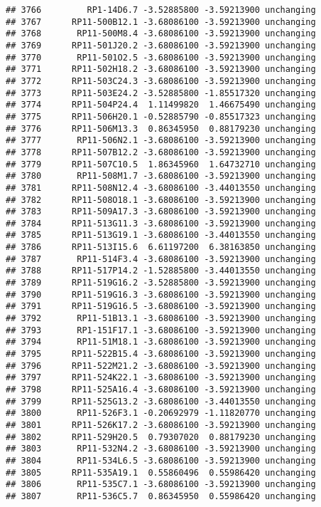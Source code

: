 \documentclass[]{article}
\begin{document}
\begin{verbatim}
## 3766         RP1-14D6.7 -3.52885800 -3.59213900 unchanging
## 3767      RP11-500B12.1 -3.68086100 -3.59213900 unchanging
## 3768       RP11-500M8.4 -3.68086100 -3.59213900 unchanging
## 3769      RP11-501J20.2 -3.68086100 -3.59213900 unchanging
## 3770       RP11-501O2.5 -3.68086100 -3.59213900 unchanging
## 3771      RP11-502H18.2 -3.68086100 -3.59213900 unchanging
## 3772      RP11-503C24.3 -3.68086100 -3.59213900 unchanging
## 3773      RP11-503E24.2 -3.52885800 -1.85517320 unchanging
## 3774      RP11-504P24.4  1.11499820  1.46675490 unchanging
## 3775      RP11-506H20.1 -0.52885790 -0.85517323 unchanging
## 3776      RP11-506M13.3  0.86345950  0.88179230 unchanging
## 3777       RP11-506N2.1 -3.68086100 -3.59213900 unchanging
## 3778      RP11-507B12.2 -3.68086100 -3.59213900 unchanging
## 3779      RP11-507C10.5  1.86345960  1.64732710 unchanging
## 3780       RP11-508M1.7 -3.68086100 -3.59213900 unchanging
## 3781      RP11-508N12.4 -3.68086100 -3.44013550 unchanging
## 3782      RP11-508O18.1 -3.68086100 -3.59213900 unchanging
## 3783      RP11-509A17.3 -3.68086100 -3.59213900 unchanging
## 3784      RP11-513G11.3 -3.68086100 -3.59213900 unchanging
## 3785      RP11-513G19.1 -3.68086100 -3.44013550 unchanging
## 3786      RP11-513I15.6  6.61197200  6.38163850 unchanging
## 3787       RP11-514F3.4 -3.68086100 -3.59213900 unchanging
## 3788      RP11-517P14.2 -1.52885800 -3.44013550 unchanging
## 3789      RP11-519G16.2 -3.52885800 -3.59213900 unchanging
## 3790      RP11-519G16.3 -3.68086100 -3.59213900 unchanging
## 3791      RP11-519G16.5 -3.68086100 -3.59213900 unchanging
## 3792       RP11-51B13.1 -3.68086100 -3.59213900 unchanging
## 3793       RP1-151F17.1 -3.68086100 -3.59213900 unchanging
## 3794       RP11-51M18.1 -3.68086100 -3.59213900 unchanging
## 3795      RP11-522B15.4 -3.68086100 -3.59213900 unchanging
## 3796      RP11-522M21.2 -3.68086100 -3.59213900 unchanging
## 3797      RP11-524K22.1 -3.68086100 -3.59213900 unchanging
## 3798      RP11-525A16.4 -3.68086100 -3.59213900 unchanging
## 3799      RP11-525G13.2 -3.68086100 -3.44013550 unchanging
## 3800       RP11-526F3.1 -0.20692979 -1.11820770 unchanging
## 3801      RP11-526K17.2 -3.68086100 -3.59213900 unchanging
## 3802      RP11-529H20.5  0.79307020  0.88179230 unchanging
## 3803       RP11-532N4.2 -3.68086100 -3.59213900 unchanging
## 3804       RP11-534L6.5 -3.68086100 -3.59213900 unchanging
## 3805      RP11-535A19.1  0.55860496  0.55986420 unchanging
## 3806       RP11-535C7.1 -3.68086100 -3.59213900 unchanging
## 3807       RP11-536C5.7  0.86345950  0.55986420 unchanging

\end{verbatim}
\end{document}
